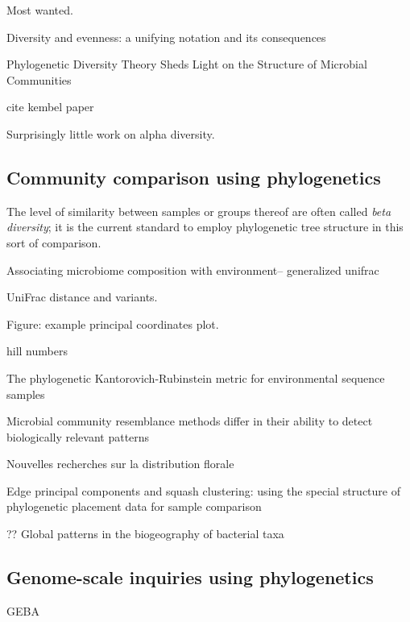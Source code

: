 \documentclass{amsart}
\begin{document}
Most wanted.

\cite{hill1973diversity}
Diversity and evenness: a unifying notation and its consequences


\cite{odwyer2012phylogenetic}
Phylogenetic Diversity Theory Sheds Light on the Structure of Microbial Communities

cite kembel paper


Surprisingly little work on alpha diversity.

\subsection{Community comparison using phylogenetics}

The level of similarity between samples or groups thereof are often called \emph{beta diversity}; it is the current standard to employ phylogenetic tree structure in this sort of comparison.

\cite{chen2012associating}
Associating microbiome composition with environment-- generalized unifrac

UniFrac distance and variants.
\cite{LozuponeKnightUniFrac05}
\cite{LozuponeEaWeightedUnifrac07}

Figure: example principal coordinates plot.

\cite{BikEaMicrobiotaStomach06}

hill numbers
\cite{chao2010phylogenetic}

\cite{evans2012phylogenetic}
The phylogenetic Kantorovich-Rubinstein metric for environmental sequence samples

\cite{kuczynski2010microbial}
Microbial community resemblance methods differ in their ability to detect biologically relevant patterns


\cite{jaccard1908nouvelles}
Nouvelles recherches sur la distribution florale


\cite{matsen2013edge}
Edge principal components and squash clustering: using the special structure of phylogenetic placement data for sample comparison

\cite{PurdomAnalyzingDataGraphs08}


\cite{nemergut2011global}
?? Global patterns in the biogeography of bacterial taxa


\subsection{Genome-scale inquiries using phylogenetics}

GEBA \cite{wu2009phylogeny}
\end{document}
